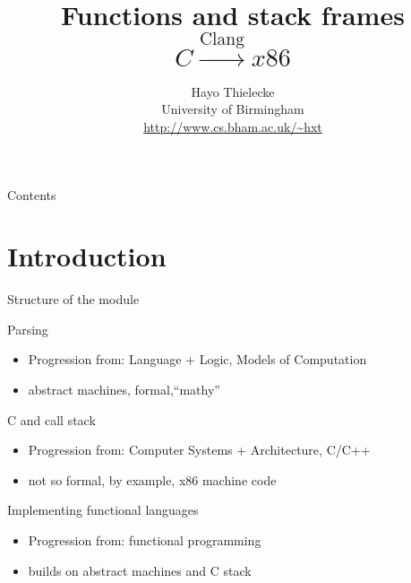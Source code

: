 \documentclass[landscape]{beamer}
\title{Functions and stack frames
\\[1em]
\(
 C \stackrel{\mbox{Clang}}{\longrightarrow} x86
 \)
 }
\author{Hayo Thielecke
\\
University of Birmingham
\\
\url{http://www.cs.bham.ac.uk/~hxt}
}
\begin{document}
\begin{frame}{}
\maketitle
\end{frame}

\begin{frame}{Contents}
\tableofcontents
\end{frame}

\section{Introduction}

\begin{frame}{Structure of the module}

\begin{block}{Parsing \checkmark}
\begin{itemize}
\item Progression from: Language + Logic, Models of Computation
\item abstract machines, formal,``mathy''
\end{itemize}
\end{block}

\begin{block}{C and call stack}
\begin{itemize}
\item Progression from: Computer Systems + Architecture, C/C++
\item not so formal, by example, x86 machine code
\end{itemize}
\end{block}

\begin{block}{Implementing functional languages}
\begin{itemize}
\item Progression from: functional programming
\item builds on abstract machines and C stack
\end{itemize}
\end{block}

\end{frame}
\end{document}
